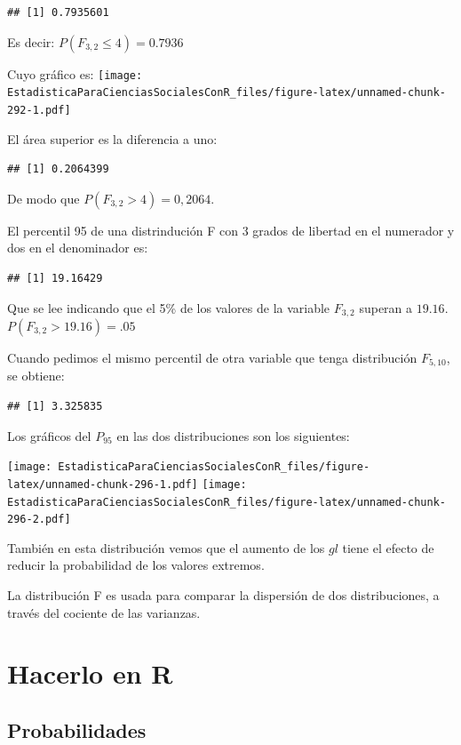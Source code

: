 \documentclass[]{book}
\begin{document}
\begin{verbatim}
## [1] 0.7935601
\end{verbatim}

Es decir: \(P(F_{3,2} \leq 4)=0.7936\)

Cuyo gráfico es:
\texttt{[image: EstadisticaParaCienciasSocialesConR\_files/figure-latex/unnamed-chunk-292-1.pdf]}

El área superior es la diferencia a uno:

\begin{verbatim}
## [1] 0.2064399
\end{verbatim}

De modo que \(P(F_{3,2} > 4) = 0,2064\).

El percentil 95 de una distrindución F con 3 grados de libertad en el numerador y dos en el denominador es:

\begin{verbatim}
## [1] 19.16429
\end{verbatim}

Que se lee indicando que el 5\% de los valores de la variable \(F_{3,2}\) superan a \(19.16\). \(P(F_{3,2}>19.16)=.05\)

Cuando pedimos el mismo percentil de otra variable que tenga distribución \(F_{5,10}\), se obtiene:

\begin{verbatim}
## [1] 3.325835
\end{verbatim}

Los gráficos del \(P_{95}\) en las dos distribuciones son los siguientes:

\texttt{[image: EstadisticaParaCienciasSocialesConR\_files/figure-latex/unnamed-chunk-296-1.pdf]} \texttt{[image: EstadisticaParaCienciasSocialesConR\_files/figure-latex/unnamed-chunk-296-2.pdf]}

También en esta distribución vemos que el aumento de los \(gl\) tiene el
efecto de reducir la probabilidad de los valores extremos.

La distribución F es usada para comparar la dispersión de dos
distribuciones, a través del cociente de las varianzas.

\hypertarget{hacerlo-en-r-5}{%
\section{Hacerlo en R}\label{hacerlo-en-r-5}}

\hypertarget{probabilidades}{%
\subsection{Probabilidades}\label{probabilidades}}
\end{document}
